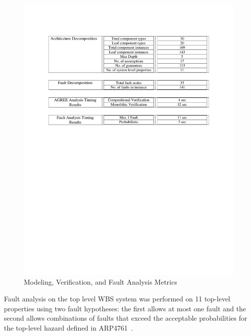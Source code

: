 \begin{figure}[h!]
	\vspace{-0.17in}
	\begin{center}
		\includegraphics[trim=0 435 0 90,clip,width=1.0\textwidth]{images/arch_table.pdf}
		\caption{Modeling, Verification, and Fault Analysis Metrics}
 		\label{fig:metrics}
	\end{center}
	\vspace{-0.40in}
\end{figure}
\fi


Fault analysis on the top level WBS system was performed on 11 top-level properties using two fault hypotheses: the first allows at most one fault and the second allows combinations of faults that exceed the acceptable probabilities for the top-level hazard defined in ARP4761~\cite{SAE:ARP4761}.

